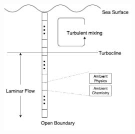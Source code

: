\documentclass[t]{beamer}
\begin{document}
\begin{frame}[c]

\begin{figure}[H]
  \begin{center}
    \includegraphics[width=0.6\textwidth,natwidth=473,natheight=466]{images/env-diagram.pdf}
  \end{center}
\end{figure}

\end{frame}
\end{document}
